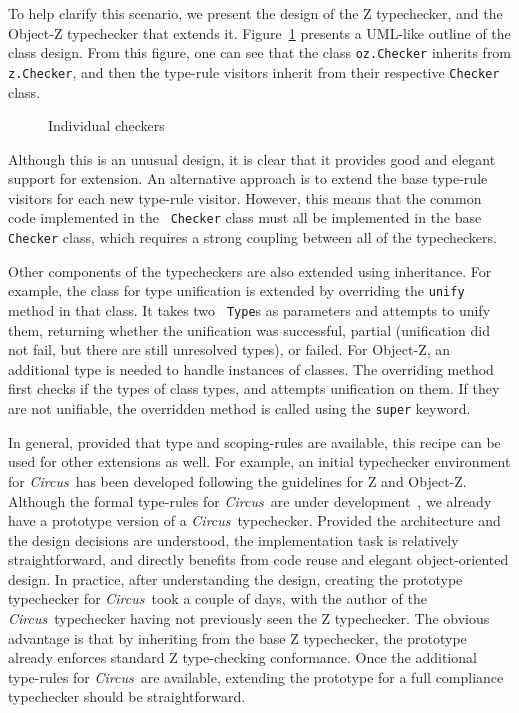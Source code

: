\documentclass{llncs}
\newcommand{\Circus}{{\sf\slshape Circus}}
\begin{document}
To help clarify this scenario, we present the design of the Z
typechecker, and the Object-Z typechecker that extends
it. Figure~\ref{tc-design} presents a UML-like outline of the class
design. From this figure, one can see that the class {\tt oz.Checker}
inherits from {\tt z.Checker}, and then the type-rule visitors inherit
from their respective {\tt Checker} class.
%
\def\epsfsize#1#2{0.70#1}
\begin{figure}[t]
\begin{center}
\caption{Individual checkers}\label{tc-design}
\end{center}
\end{figure}
\def\epsfsize#1#2{\epsfxsize}
%
Although this is an unusual design, it is clear that it provides good
and elegant support for extension.  An alternative approach is to
extend the base type-rule visitors for each new type-rule visitor.
However, this means that the common code implemented in the {\tt
Checker} class must all be implemented in the base {\tt Checker}
class, which requires a strong coupling between all of the
typecheckers.

Other components of the typecheckers are also extended using
inheritance.  For example, the class for type unification is extended
by overriding the {\tt unify} method in that class.  It takes two {\tt
Type}s as parameters and attempts to unify them, returning whether the
unification was successful, partial (unification did not fail, but
there are still unresolved types), or failed.  For Object-Z, an
additional type is needed to handle instances of classes.  The
overriding method first checks if the types of class types, and
attempts unification on them.  If they are not unifiable, the
overridden method is called using the {\tt super} keyword.

In general, provided that type and scoping-rules are available, this
recipe can be used for other extensions as well.  For example, an
initial typechecker environment for \Circus\ has been developed
following the guidelines for Z and Object-Z. Although the formal
type-rules for \Circus\ are under
development~\cite{circus.other:typechecker}, we already have a
prototype version of a \Circus\ typechecker.  Provided the
architecture and the design decisions are understood, the
implementation task is relatively straightforward, and directly
benefits from code reuse and elegant object-oriented design.  In
practice, after understanding the design, creating the prototype
typechecker for \Circus\ took a couple of days, with the author of the
\Circus\ typechecker having not previously seen the Z
typechecker. The obvious advantage is that by inheriting from the
base Z typechecker, the prototype already enforces standard Z
type-checking conformance. Once the additional type-rules for \Circus\
are available, extending the prototype for a full compliance typechecker
should be straightforward.
\end{document}
